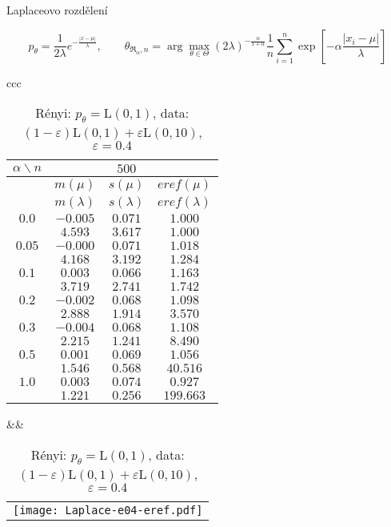 \documentclass[11pt,a4paper]{beamer}
\newcommand{\amtiT}{\arg \max_{\theta \in \Theta}}
\begin{document}
\begin{frame}{Laplaceovo rozdělení}

		{\footnotesize \[p_\theta = \frac{1}{2\lambda} e^{-\frac{|x-\mu|}{\lambda}},\qquad		\theta_{\mathfrak{R}_\alpha,n} = \amtiT (2\lambda)^{-\frac{\alpha}{1+\alpha}} \frac{1}{n} \sum_{i=1}^n \exp \left[-\alpha\frac{|x_i-\mu|}{\lambda} \right] \]}
\begin{table}[htb] \tiny
\begin{center}
\begin{tabular}{ccc}
	\begin{tabular}{|c|ccc|}
	\hline
	$\alpha\backslash n$ &&  $500$ & \\
	\hline
	& $m(\mu)$ & $s(\mu)$ & $eref(\mu)$ \\
	& $m(\lambda)$ & $s(\lambda)$ & $eref(\lambda)$ \\
	\hline
	$0.0$ & $ -0.005 $ & $ 0.071 $ & $ 1.000 $\\
	 & $ 4.593 $ & $ 3.617 $ & $ 1.000 $\\
	\hline
	$0.05$ & $ -0.000 $ & $ 0.071 $ & $ 1.018 $\\
	 & $ 4.168 $ & $ 3.192 $ & $ 1.284 $\\
	\hline
	$0.1$ & $ 0.003 $ & $ 0.066 $ & $ 1.163 $\\
	 & $ 3.719 $ & $ 2.741 $ & $ 1.742 $\\
	\hline
	$0.2$ & $ -0.002 $ & $ 0.068 $ & $ 1.098 $\\
	 & $ 2.888 $ & $ 1.914 $ & $ 3.570 $\\
	\hline
	$0.3$ & $ -0.004 $ & $ 0.068 $ & $ 1.108 $\\
	 & $ 2.215 $ & $ 1.241 $ & $ 8.490 $\\
	\hline
	$0.5$ & $ 0.001 $ & $ 0.069 $ & $ 1.056 $\\
	 & $ 1.546 $ & $ 0.568 $ & $ 40.516 $\\
	\hline
	$1.0$ & $ 0.003 $ & $ 0.074 $ & $ 0.927 $\\
	 & $ 1.221 $ & $ 0.256 $ & $ 199.663 $\\
	\hline
	\end{tabular}
&&
	\begin{tabular}{c}
		\texttt{[image: Laplace-e04-eref.pdf]}
	\end{tabular}
\\
\end{tabular}
\end{center}
\caption{\footnotesize R\'{e}nyi: $p_\theta = \mathrm{L}(0,1)$, data: $(1-\varepsilon)\mathrm{L}(0,1) + \varepsilon \mathrm{L}(0,10)$, $\varepsilon =  0.4$}
\label{tabJK:laplace-eref}
\end{table}

\end{frame}
\end{document}
